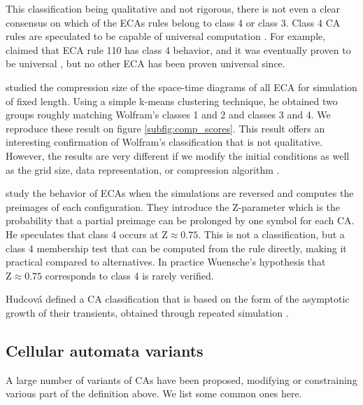 This classification being qualitative and not rigorous, there is not even a
clear consensus on which of the \acp{ECA} rules belong to class 4 or class 3.
Class 4 \ac{CA} rules are speculated to be capable of universal computation
\parencite{wolframUniversalityComplexityCellular1984}. For example,
\textcite{liStructureElementaryCellular1990} claimed that \ac{ECA} rule 110 has
class 4 behavior, and it was eventually proven to be universal
\parencite{cookUniversalityElementaryCellular2004}, but no other \ac{ECA} has
been proven universal since.

\textcite{zenilCompressionBasedInvestigationDynamical2010} studied the
compression size of the space-time diagrams of all \ac{ECA} for simulation of
fixed length. Using a simple k-means clustering technique, he obtained two
groups roughly matching Wolfram’s classes 1 and 2 and classes 3 and 4. We
reproduce these result on figure \ref{subfig:comp_scores}. This result offers an
interesting confirmation of Wolfram's classification that is not qualitative.
However, the results are very different if we modify the initial conditions as
well as the grid size, data representation, or compression algorithm
\parencite{hudcovaClassificationComplexSystems2020}.

\textcite{wuenscheGlobalDynamicsCellular1992} study the behavior of \acp{ECA}
when the simulations are reversed and computes the preimages of each
configuration. They introduce the Z-parameter which is the probability that a
partial preimage can be prolonged by one symbol for each \ac{CA}. He speculates
that class 4 occurs at $\text{Z} \approx 0.75$. This is not a classification,
but a class 4 membership test that can be computed from the rule directly,
making it practical compared to alternatives. In practice Wuensche's hypothesis
that $\text{Z} \approx 0.75$ corresponds to class 4 is rarely verified.

Hudcová defined a \ac{CA} classification that is based on the form of the
asymptotic growth of their transients, obtained through repeated simulation
\parencite{hudcovaClassificationComplexSystems2020,
  hudcovaClassificationDiscreteDynamical2022}.

\subsection{Cellular automata variants}

A large number of variants of \acp{CA} have been proposed, modifying or
constraining various part of the definition above. We list some common ones
here.

